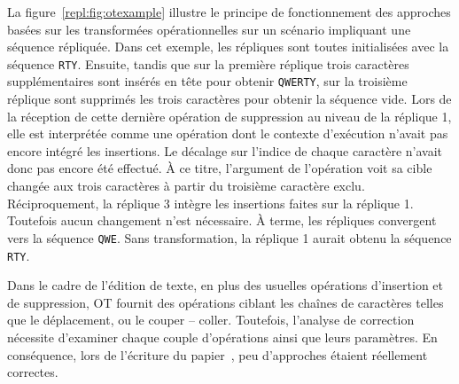 La figure~\ref{repl:fig:otexample} illustre le principe de fonctionnement des
approches basées sur les transformées opérationnelles sur un scénario impliquant
une séquence répliquée. Dans cet exemple, les répliques sont toutes initialisées
avec la séquence \texttt{RTY}. Ensuite, tandis que sur la première réplique
trois caractères supplémentaires sont insérés en tête pour obtenir
\texttt{QWERTY}, sur la troisième réplique sont supprimés les trois caractères
pour obtenir la séquence vide. Lors de la réception de cette dernière opération
de suppression au niveau de la réplique 1, elle est interprétée comme une
opération dont le contexte d'exécution n'avait pas encore intégré les
insertions. Le décalage sur l'indice de chaque caractère n'avait donc pas encore
été effectué. À ce titre, l'argument de l'opération voit sa cible changée aux
trois caractères à partir du troisième caractère exclu. Réciproquement, la
réplique 3 intègre les insertions faites sur la réplique 1. Toutefois aucun
changement n'est nécessaire. À terme, les répliques convergent vers la séquence
\texttt{QWE}. Sans transformation, la réplique 1 aurait obtenu la séquence
\texttt{RTY}.

Dans le cadre de l'édition de texte, en plus des usuelles opérations d'insertion
et de suppression, OT fournit des opérations ciblant les chaînes de caractères
telles que le déplacement, ou le couper -- coller. Toutefois, l'analyse de
correction nécessite d'examiner chaque couple d'opérations ainsi que leurs
paramètres. En conséquence, lors de l'écriture du
papier~\cite{imine2003proving}, peu d'approches étaient réellement correctes.


